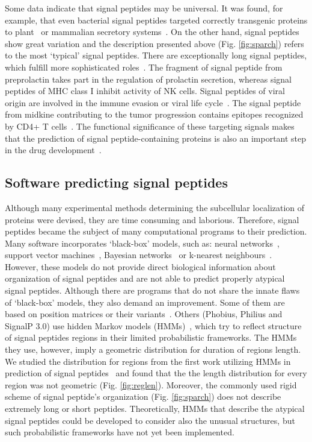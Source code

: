 \documentclass[fleqn,10pt,twoside]{gcb15submission}
\begin{document}
Some data indicate that signal peptides may be universal. It was found, for example, that even bacterial signal peptides targeted correctly transgenic proteins to plant~\citep{2009moellera} or mammalian secretory systems~\citep{2014naganoestablishment}. On the other hand, signal peptides show great variation and the description presented above (Fig. \ref{fig:sparch}) refers to the most ‘typical’ signal peptides. There are  exceptionally long signal peptides, which fulfill more sophisticated roles~\citep{2009hissarchitecture}. The fragment of signal peptide from preprolactin takes part in the regulation of prolactin secretion, whereas signal peptides of MHC class I inhibit activity of NK cells. Signal peptides of viral origin are involved in the immune evasion or viral life cycle~\citep{2000kappposttargeting}. The signal peptide from midkine contributing to the tumor progression contains epitopes recognized by CD4+ T cells~\citep{2013kerzerhothe}. The functional significance of these targeting signals makes that the prediction of signal peptide-containing proteins is also an important step in the drug development~\citep{2005zhangalteration, 2012netoadeimproving, 2010moellerwetmilling}.


\subsection*{Software predicting signal peptides}

Although many experimental methods determining the subcellular localization of proteins were devised, they are time consuming and laborious. Therefore, signal peptides became the subject of many computational programs to their prediction. Many software incorporates ‘black-box’ models, such as: neural networks~\citep{2011petersensignalp}, support vector machines~\citep{2014zhangprediction}, Bayesian networks~\citep{2012zhengsignalbnf} or k-nearest neighbours~\citep{2007shensignall}. However, these models do not provide direct biological information about organization of signal peptides and are not able to predict properly atypical signal peptides. Although there are programs that do not share the innate flaws of ‘black-box’ models, they also demand an improvement. Some of them are based on position matrices or their variants~\citep{2014zhangprediction, 2004hillerpredisi}. Others (Phobius, Philius and SignalP 3.0) use hidden Markov models (HMMs)~\citep{2004klla, 2008reynoldstransmembrane, 2004bendtsenimproved}, which try to reflect structure of signal peptides regions in their limited probabilistic frameworks. The HMMs they use, however, imply a geometric distribution for duration of regions length. We studied the distribution for regions from the first work utilizing HMMs in prediction of signal peptides~\citep{1998nielsenprediction} and found that the the length distribution for every region was not geometric (Fig. \ref{fig:reglen}). Moreover, the commonly used rigid scheme of signal peptide's organization (Fig. \ref{fig:sparch}) does not describe extremely long or short peptides. Theoretically, HMMs that describe the atypical signal peptides could be developed to consider also the unusual structures, but such probabilistic frameworks have not yet been implemented.
\end{document}
